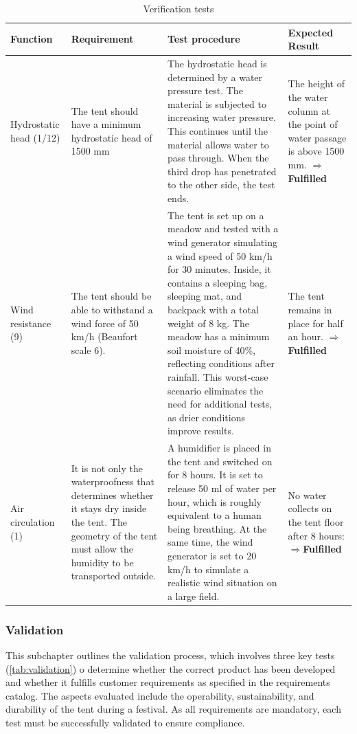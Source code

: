 \documentclass{article}
\begin{document}
\begin{table}[ht!]
    \caption{Verification tests}
    \label{tab:verification}
    \begin{tabularx}{\textwidth}{|>{\raggedright\arraybackslash}p{2.5cm}|>{\raggedright\arraybackslash}p{3.5cm}|>{\raggedright\arraybackslash}p{6cm}|>{\raggedright\arraybackslash}X|}
    \hline
    \rowcolor[gray]{0.75}
    \textbf{Function} & \textbf{Requirement} & \textbf{Test procedure} & \textbf{Expected Result} \\
    \hline
    Hydrostatic head (1/12) & 
    The tent should have a minimum hydrostatic head of 1500 mm & 
    The hydrostatic head is determined by a water pressure test. The material is subjected to increasing water pressure. This continues until the material allows water to pass through. When the third drop has penetrated to the other side, the test ends. &
    The height of the water column at the point of water passage is above 1500 mm. $\mathbf{\Rightarrow}$\textcolor{newgreen}{\textbf{Fulfilled}} \\
    \hline
    Wind resistance (9) &
    The tent should be able to withstand a wind force of 50 km/h (Beaufort scale 6). &
    The tent is set up on a meadow and tested with a wind generator simulating a wind speed of 50 km/h for 30 minutes. Inside, it contains a sleeping bag, sleeping mat, and backpack with a total weight of 8 kg. The meadow has a minimum soil moisture of 40\%, reflecting conditions after rainfall. This worst-case scenario eliminates the need for additional tests, as drier conditions improve results. &
    The tent remains in place for half an hour. $\mathbf{\Rightarrow}$\textcolor{newgreen}{\textbf{Fulfilled}} \\
    \hline
    Air circulation (1) &
    It is not only the waterproofness that determines whether it stays dry inside the tent. The geometry of the tent must allow the humidity to be transported outside. &
    A humidifier is placed in the tent and switched on for 8 hours. It is set to release 50 ml of water per hour, which is roughly equivalent to a human being breathing. At the same time, the wind generator is set to 20 km/h to simulate a realistic wind situation on a large field. &
    No water collects on the tent floor after 8 hours: $\mathbf{\Rightarrow}$\textcolor{newgreen}{\textbf{Fulfilled}} \\
    \hline
    \end{tabularx}
\end{table}

\newpage
\subsubsection{Validation}
This subchapter outlines the validation process, which involves three key tests
(\autoref{tab:validation}) o determine whether the correct product has been developed
and whether it fulfills customer requirements as specified in the requirements catalog. The
aspects evaluated include the operability, sustainability, and durability of the tent during a
festival. As all requirements are mandatory, each test must be successfully validated to ensure
compliance.
\end{document}
